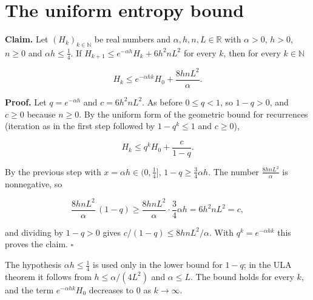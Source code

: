 \documentclass[11pt,a4paper]{article}
\begin{document}
\section{\texorpdfstring{The uniform entropy bound}{The uniform entropy bound}}


\textbf{Claim.} Let \((H_k)_{k\in\mathbb N}\) be real numbers and \(\alpha,h,n,L\in\mathbb R\) with \(\alpha>0\), \(h>0\), \(n\ge0\) and \(\alpha h\le\frac14\). If \(H_{k+1}\le e^{-\alpha h}H_k+6h^2nL^2\) for every \(k\), then for every \(k\in\mathbb N\)


\[H_k\le e^{-\alpha hk}H_0+\frac{8hnL^2}{\alpha}.\]


\textbf{Proof.} Let \(q=e^{-\alpha h}\) and \(c=6h^2nL^2\). As before \(0\le q<1\), so \(1-q>0\), and \(c\ge0\) because \(n\ge0\). By the uniform form of the geometric bound for recurrences (iteration as in the first step followed by \(1-q^k\le1\) and \(c\ge0\)),


\[H_k\le q^kH_0+\frac{c}{1-q}.\]


By the previous step with \(x=\alpha h\in(0,\frac14]\), \(1-q\ge\frac34\alpha h\). The number \(\frac{8hnL^2}{\alpha}\) is nonnegative, so


\[\frac{8hnL^2}{\alpha}\,(1-q)\ge\frac{8hnL^2}{\alpha}\cdot\frac34\alpha h=6h^2nL^2=c,\]


and dividing by \(1-q>0\) gives \(c/(1-q)\le8hnL^2/\alpha\). With \(q^k=e^{-\alpha hk}\) this proves the claim. \(\square\)




The hypothesis \(\alpha h\le\frac14\) is used only in the lower bound for \(1-q\); in the ULA theorem it follows from \(h\le\alpha/(4L^2)\) and \(\alpha\le L\). The bound holds for every \(k\), and the term \(e^{-\alpha hk}H_0\) decreases to \(0\) as \(k\to\infty\).
\end{document}
